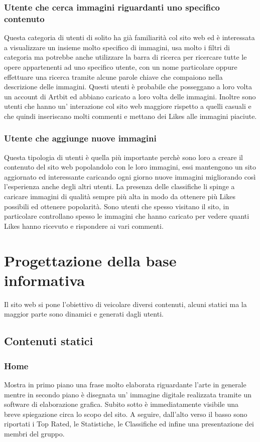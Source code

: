 \documentclass[openany, a4paper, 12pt]{report}
\begin{document}
		\subsubsection{Utente che cerca immagini riguardanti uno specifico contenuto}
		Questa categoria di utenti di solito ha già familiarità col sito web ed è interessata a visualizzare un insieme molto specifico di immagini, usa molto i filtri di categoria ma potrebbe anche utilizzare la barra di ricerca per ricercare tutte le opere appartenenti ad uno specifico utente, con un nome particolare oppure effettuare una ricerca tramite alcune parole chiave che compaiono nella descrizione delle immagini. Questi utenti è probabile che posseggano a loro volta un account di Artbit ed abbiano caricato a loro volta delle immagini. Inoltre sono utenti che hanno un' interazione col sito web maggiore rispetto a quelli casuali e che quindi inseriscano molti commenti e mettano dei Likes alle immagini piaciute.\\
		\subsubsection{Utente che aggiunge nuove immagini}
		Questa tipologia di utenti è quella più importante perchè sono loro a creare il contenuto del sito web popolandolo con le loro immagini, essi mantengono un sito aggiornato ed interessante caricando ogni giorno nuove immagini migliorando così l'esperienza anche degli altri utenti. La presenza delle classifiche li spinge a caricare immagini di qualità sempre più alta in modo da ottenere più Likes possibili ed ottenere popolarità. Sono utenti che spesso visitano il sito, in particolare controllano spesso le immagini che hanno caricato per vedere quanti Likes hanno ricevuto e rispondere ai vari commenti.\\

	\section{Progettazione della base informativa}
		Il sito web si pone l'obiettivo di veicolare diversi contenuti, alcuni statici ma la maggior parte sono dinamici e generati dagli utenti.\\
	\subsection{Contenuti statici}
		\subsubsection{Home}
		Mostra in primo piano una frase molto elaborata riguardante l'arte in generale mentre in secondo piano è disegnata un' immagine digitale realizzata tramite un software di elaborazione grafica. Subito sotto è immediatamente visibile una breve spiegazione circa lo scopo del sito. A seguire, dall'alto verso il basso sono riportati i Top Rated, le Statistiche, le Classifiche ed infine una presentazione dei membri del gruppo.
		
\end{document}
